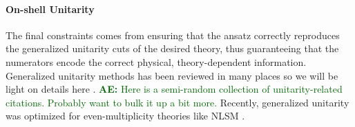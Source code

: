 \documentclass[11pt,letter]{article}
\newcommand{\ace}[1]{\textcolor{darkgreen}{\textbf{AE:}{ #1}}}
\begin{document}
\paragraph{On-shell Unitarity}

The final constraints comes from ensuring that the ansatz correctly
reproduces the generalized unitarity cuts of the desired theory, thus
guaranteeing that the numerators encode the correct physical,
theory-dependent information.  Generalized unitarity methods has been
reviewed in many places so we will be light on details here
\cite{BCFUnitarity, BernHuangReview, Bern:2015ooa, Bourjaily:2017wjl,
  JJHenrikReview, FivePointN4BCJ, Bern:2012uf, BCJreview,
  Edison:2022jln, Edison:2022jln}.  \ace{Here is a semi-random
  collection of unitarity-related citations.  Probably want to bulk it
  up a bit more.}  Recently, generalized unitarity was optimized for
even-multiplicity theories like NLSM \cite{Carrasco:2023qgz}.
\end{document}
